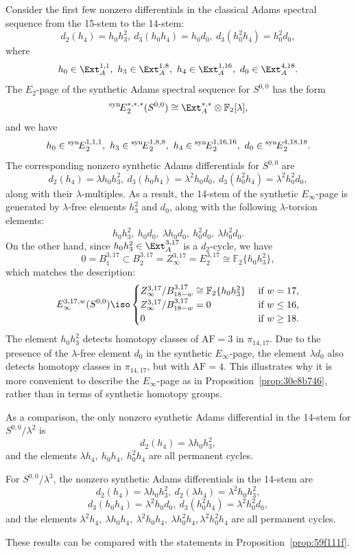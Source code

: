\documentclass{amsart}
\numberwithin{equation}{section}
\newcommand{\AF}{\mathrm{AF}}
\newcommand{\SynSS}{\prescript{\mathrm{syn}\!}{}{E}}
\begin{document}
\begin{example} \label{exam:synEinfty}
    Consider the first few nonzero differentials in the classical Adams spectral sequence from the 15-stem to the 14-stem: 
    $$d_2(h_4) = h_0h_3^2,  \ d_3(h_0h_4) = h_0d_0, \ d_3(h_0^2h_4) = h_0^2d_0,$$
    where $$h_0 \in \Ext_A^{1,1}, \ h_3 \in \Ext_A^{1,8}, \ h_4 \in \Ext_A^{1,16}, \ d_0 \in \Ext_A^{4,18}.$$
    The $E_2$-page of the synthetic Adams spectral sequence for $S^{0,0}$ has the form
    $$\SynSS_2^{*,*,*}(S^{0,0}) \cong \Ext_A^{*,*}\otimes \mathbb{F}_2[\lambda],$$
    and we have
    $$h_0 \in \SynSS_2^{1,1,1}, \ h_3 \in \SynSS_2^{1,8,8}, \ h_4 \in \SynSS_2^{1,16,16}, \ d_0 \in \SynSS_2^{4,18,18}.$$
    The corresponding nonzero synthetic Adams differentials for $S^{0,0}$ are
    $$d_2(h_4) = \lambda h_0h_3^2,  \ d_3(h_0h_4) = \lambda^2 h_0d_0, \ d_3(h_0^2h_4) = \lambda^2 h_0^2d_0,$$
    along with their $\lambda$-multiples. As a result, the 14-stem of the synthetic $E_\infty$-page is generated by $\lambda$-free elements $h_3^2$ and $d_0$, along with the following $\lambda$-torsion elements:
    $$h_0h_3^2, \ h_0d_0, \ \lambda h_0d_0, \ h_0^2d_0, \ \lambda h_0^2d_0.$$
    On the other hand, since $h_0h_3^2 \in \Ext_A^{3,17}$ is a $d_2$-cycle, we have 
    $$0 = B_1^{3,17} \subset B_2^{3,17} = Z_\infty^{3,17} = E_2^{3,17} \cong \mathbb{F}_2\{h_0h_3^2\},$$
    which matches the description:
    $$E_\infty^{3,17,w}(S^{0,0})\iso\begin{cases}
        Z_\infty^{3,17}/B_{18-w}^{3,17} \cong \mathbb{F}_2\{h_0h_3^2\} & \text{ if } w = 17,\\
        Z_\infty^{3,17}/B_{18-w}^{3,17} = 0 & \text{ if } w \le 16,\\
        0 & \text{ if } w \ge 18.
    \end{cases}$$
    The element $h_0h_3^2$ detects homotopy classes of $\AF=3$ in $\pi_{14,17}$. Due to the presence of the $\lambda$-free element $d_0$ in the synthetic $E_\infty$-page, the element $\lambda d_0$ also detects homotopy classes in $\pi_{14,17}$, but with $\AF=4$. This illustrates why it is more convenient to describe the $E_\infty$-page as in Proposition~\ref{prop:30e8b746}, rather than in terms of synthetic homotopy groups.
    
    As a comparison, the only nonzero synthetic Adams differential in the 14-stem for $S^{0,0}/\lambda^2$ is 
    $$d_2(h_4) = \lambda h_0h_3^2,$$
    and the elements $\lambda h_4, \ h_0h_4, \ h_0^2h_4$ are all permanent cycles. 

    For $S^{0,0}/\lambda^3$, the nonzero synthetic Adams differentials in the 14-stem are
    $$d_2(h_4) = \lambda h_0h_3^2, \  d_2(\lambda h_4) = \lambda^2 h_0h_3^2,$$ 
    $$d_3(h_0h_4) = \lambda^2 h_0d_0, \ d_3(h_0^2h_4) = \lambda^2 h_0^2d_0,$$
    and the elements $\lambda^2 h_4, \ \lambda h_0h_4, \ \lambda^2 h_0h_4, \ \lambda h_0^2h_4, \lambda^2 h_0^2h_4$ are all permanent cycles. 

    These results can be compared with the statements in Proposition~\ref{prop:59f111f}.
\end{example}
\end{document}

